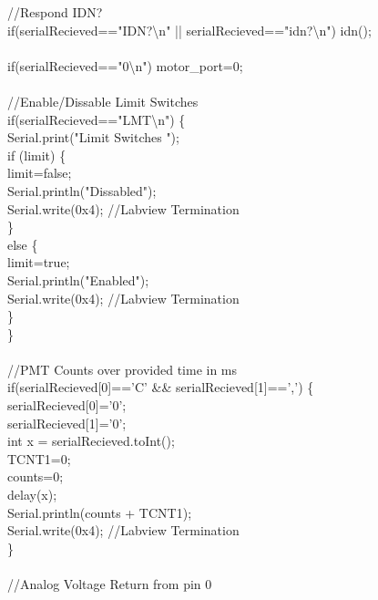 {{\tabto*{.5cm}	//Respond IDN?\\
\tabto*{.5cm}	if(serialRecieved=="IDN?\textbackslash n" || serialRecieved=="idn?\textbackslash n") idn();\\
\\	
\tabto*{.5cm}	if(serialRecieved=="0\textbackslash n") motor\_port=0;\\
\\	
\tabto*{.5cm}	//Enable/Dissable Limit Switches\\
\tabto*{.5cm}	if(serialRecieved=="LMT\textbackslash n") \{\\
\tabto*{1cm}		Serial.print("Limit Switches ");\\
\tabto*{1cm}		if (limit) \{\\
\tabto*{1.5cm}			limit=false;\\
\tabto*{1.5cm}			Serial.println("Dissabled");\\
\tabto*{1.5cm}			Serial.write(0x4);\tabto*{7.5cm}  //Labview Termination\\
\tabto*{1cm}		\}\\
\tabto*{1cm}		else \{\\
\tabto*{1.5cm}			limit=true;\\
\tabto*{1.5cm}			Serial.println("Enabled");\\
\tabto*{1.5cm}			Serial.write(0x4); \tabto*{7.5cm} //Labview Termination\\
\tabto*{1cm}		\}\\ 
\tabto*{.5cm}	\}\\
\\	
\tabto*{.5cm}	//PMT Counts over provided time in ms\\
\tabto*{.5cm}	if(serialRecieved[0]=='C' \&\& serialRecieved[1]==',') \{\\		
\tabto*{1cm}		serialRecieved[0]='0';\\
\tabto*{1cm}		serialRecieved[1]='0';\\
\tabto*{1cm}		int x = serialRecieved.toInt();\\
\tabto*{1cm}		TCNT1=0;\\
\tabto*{1cm}		counts=0;\\
\tabto*{1cm}		delay(x);\\
\tabto*{1cm}		Serial.println(counts + TCNT1);\\
\tabto*{1cm}		Serial.write(0x4); \tabto*{7.5cm} //Labview Termination\\
\tabto*{.5cm}	\}\\
\\	
\tabto*{.5cm}	//Analog Voltage Return from pin 0\\
}}
